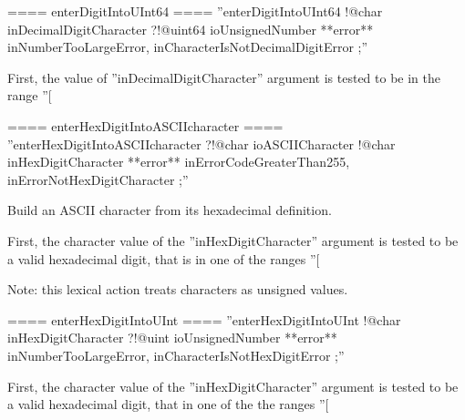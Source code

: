 ==== enterDigitIntoUInt64 ====
''enterDigitIntoUInt64 !@char inDecimalDigitCharacter ?!@uint64 ioUnsignedNumber **error** inNumberTooLargeError, inCharacterIsNotDecimalDigitError ;''

First, the value of ''inDecimalDigitCharacter'' argument is tested to be in the range ''[%

==== enterHexDigitIntoASCIIcharacter ====
''enterHexDigitIntoASCIIcharacter ?!@char ioASCIICharacter !@char inHexDigitCharacter **error** inErrorCodeGreaterThan255, inErrorNotHexDigitCharacter ;''

Build an ASCII character from its hexadecimal definition.

First, the character value of the ''inHexDigitCharacter'' argument is tested to be a valid hexadecimal digit, that is in one of the ranges ''[%

Note: this lexical action treats characters as unsigned values.

==== enterHexDigitIntoUInt ====
''enterHexDigitIntoUInt !@char inHexDigitCharacter ?!@uint ioUnsignedNumber **error** inNumberTooLargeError, inCharacterIsNotHexDigitError ;''

First, the character value of the ''inHexDigitCharacter'' argument is tested to be a valid hexadecimal digit, that in one of the the ranges ''[%

